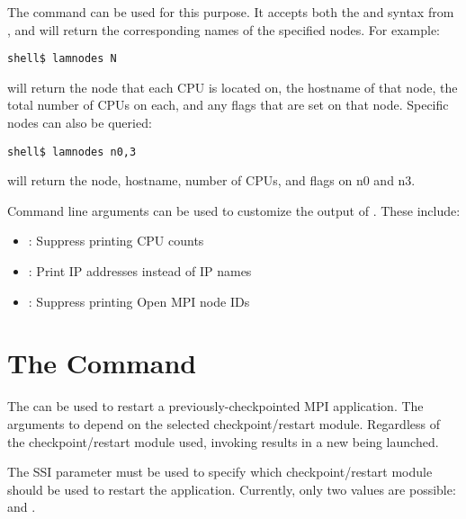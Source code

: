 The command  can be used for this purpose.  It accepts
both the  and  syntax from , and will return the
corresponding names of the specified nodes.  For example:

\lstset{style=lam-cmdline}
\begin{lstlisting}
shell$ lamnodes N
\end{lstlisting}

\noindent will return the node that each CPU is located on, the
hostname of that node, the total number of CPUs on each, and any flags
that are set on that node.  Specific nodes can also be queried:

\lstset{style=lam-cmdline}
\begin{lstlisting}
shell$ lamnodes n0,3
\end{lstlisting}

\noindent will return the node, hostname, number of CPUs, and flags on
n0 and n3.

Command line arguments can be used to customize the output of
.  These include:

\begin{itemize}
\item {}: Suppress printing CPU counts
\item {}: Print IP addresses instead of IP names
\item {}: Suppress printing Open MPI node IDs
\end{itemize}


\section{The  Command}

The  can be used to restart a previously-checkpointed
MPI application.  The arguments to  depend on the
selected checkpoint/restart module.  Regardless of the
checkpoint/restart module used, invoking  results in a
new  being launched.

The SSI parameter  must be used to specify which
checkpoint/restart module should be used to restart the application.
Currently, only two values are possible:  and
.

